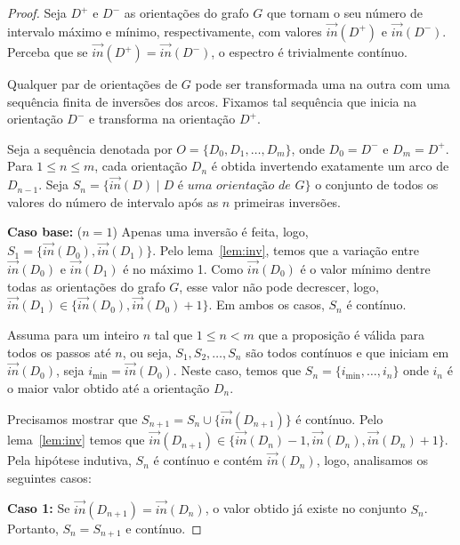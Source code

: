 \begin{proof}
  Seja $D^+$ e $D^-$ as orientações do grafo $G$ que tornam o seu número de intervalo máximo e mínimo, respectivamente, com valores $\overrightarrow{in}(D^+)$ e $\overrightarrow{in}(D^-)$. Perceba que se $\overrightarrow{in}(D^+) = \overrightarrow{in}(D^-)$, o espectro é trivialmente contínuo.

  Qualquer par de orientações de $G$ pode ser transformada uma na outra com uma sequência finita de inversões dos arcos. Fixamos tal sequência que inicia na orientação $D^-$ e transforma na orientação $D^+$.

  Seja a sequência denotada por $O = \{D_0, D_1, \ldots, D_m\}$, onde $D_0 = D^-$ e $D_m = D^+$. Para $1 \leq n \leq m$, cada orientação $D_n$ é obtida invertendo exatamente um arco de $D_{n-1}$. Seja $S_{n} = \{\overrightarrow{in}(D) \mid \textit{D é uma orientação de G}\}$ o conjunto de todos os valores do número de intervalo após as $n$ primeiras inversões. 

  \noindent \textbf{Caso base:} ($n = 1$) Apenas uma inversão é feita, logo, $S_1 = \{\overrightarrow{in}(D_0), \overrightarrow{in}(D_1)\}$. Pelo lema~\ref{lem:inv}, temos que a variação entre $\overrightarrow{in}(D_0)$ e $\overrightarrow{in}(D_1)$ é no máximo 1. Como $\overrightarrow{in}(D_0)$ é o valor mínimo dentre todas as orientações do grafo $G$, esse valor não pode decrescer, logo, $\overrightarrow{in}(D_1) \in \{\overrightarrow{in}(D_0), \overrightarrow{in}(D_0)+1\}$. Em ambos os casos, $S_n$ é contínuo.

   Assuma para um inteiro $n$ tal que $1\leq n < m$ que a proposição é válida para todos os passos até $n$, ou seja, $S_1, S_2, \ldots, S_n$ são todos contínuos e que iniciam em $\overrightarrow{in}(D_0)$, seja $i_{\min} =  \overrightarrow{in}(D_0)$. Neste caso, temos que $S_n = \{i_{\min}, \ldots, i_n\} $ onde $i_n$ é o maior valor obtido até a orientação $D_n$.

   Precisamos mostrar que $S_{n+1} = S_n \cup \{\overrightarrow{in}(D_{n+1})\}$ é contínuo. Pelo lema~\ref{lem:inv} temos que  $\overrightarrow{in}(D_{n+1}) \in \{\overrightarrow{in}(D_{n})-1, \overrightarrow{in}(D_{n}), \overrightarrow{in}(D_{n})+1\}$. Pela hipótese indutiva, $S_n$ é contínuo e contém $\overrightarrow{in}(D_n)$, logo, analisamos os seguintes casos:

  \noindent \textbf{Caso 1:} Se $\overrightarrow{in}(D_{n+1}) = \overrightarrow{in}(D_n)$, o valor obtido já existe no conjunto $S_n$. Portanto, $S_n = S_{n+1}$ e contínuo.


\end{proof}
